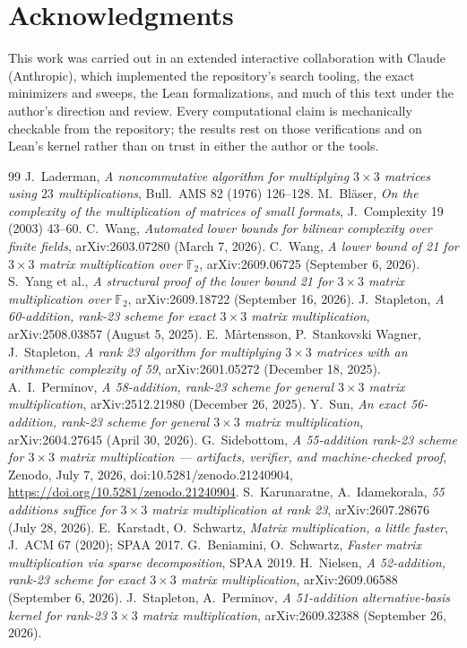 \documentclass[11pt]{article}
\theoremstyle{definition}
\theoremstyle{remark}
\newcommand{\F}{\mathbb{F}}
\begin{document}
\section*{Acknowledgments}

This work was carried out in an extended interactive collaboration
with Claude (Anthropic), which implemented the repository's search
tooling, the exact minimizers and sweeps, the Lean formalizations, and
much of this text under the author's direction and review.  Every
computational claim is mechanically checkable from the repository; the
results rest on those verifications and on Lean's kernel rather than
on trust in either the author or the tools.

\begin{thebibliography}{99}
 J.~Laderman, \emph{A noncommutative algorithm for
multiplying $3\times3$ matrices using $23$ multiplications}, Bull.\
AMS 82 (1976) 126--128.
 M.~Bl\"aser, \emph{On the complexity of the
multiplication of matrices of small formats}, J.\ Complexity 19
(2003) 43--60.
 C.~Wang, \emph{Automated lower bounds for bilinear
complexity over finite fields}, arXiv:2603.07280 (March 7, 2026).
\bibitem{Wang26b} C.~Wang, \emph{A lower bound of 21 for $3\times3$
matrix multiplication over $\F_2$}, arXiv:2609.06725 (September 6, 2026).
\bibitem{Qiushi26} S.~Yang et al., \emph{A structural proof of the
lower bound 21 for $3\times3$ matrix multiplication over $\F_2$},
arXiv:2609.18722 (September 16, 2026).
 J.~Stapleton, \emph{A 60-addition, rank-23
scheme for exact $3\times3$ matrix multiplication}, arXiv:2508.03857
(August 5, 2025).
 E.~M{\aa}rtensson, P.~Stankovski Wagner, J.~Stapleton,
\emph{A rank 23 algorithm for multiplying $3\times3$ matrices with an
arithmetic complexity of 59}, arXiv:2601.05272 (December 18, 2025).
\bibitem{Perminov25} A.~I.~Perminov, \emph{A 58-addition, rank-23
scheme for general $3\times3$ matrix multiplication}, arXiv:2512.21980
(December 26, 2025).
 Y.~Sun, \emph{An exact 56-addition, rank-23 scheme for
general $3\times3$ matrix multiplication}, arXiv:2604.27645
(April 30, 2026).
 G.~Sidebottom, \emph{A 55-addition rank-23
scheme for $3\times3$ matrix multiplication --- artifacts, verifier,
and machine-checked proof}, Zenodo, July 7, 2026,
doi:10.5281/zenodo.21240904,
\url{https://doi.org/10.5281/zenodo.21240904}.
 S.~Karunaratne, A.~Idamekorala, \emph{55 additions
suffice for $3\times3$ matrix multiplication at rank 23},
arXiv:2607.28676 (July 28, 2026).
 E.~Karstadt, O.~Schwartz, \emph{Matrix multiplication,
a little faster}, J.\ ACM 67 (2020); SPAA 2017.
 G.~Beniamini, O.~Schwartz, \emph{Faster matrix
multiplication via sparse decomposition}, SPAA 2019.
 H.~Nielsen, \emph{A 52-addition, rank-23 scheme
for exact $3\times3$ matrix multiplication}, arXiv:2609.06588
(September 6, 2026).
 J.~Stapleton, A.~Perminov, \emph{A 51-addition
alternative-basis kernel for rank-23 $3\times3$ matrix multiplication},
arXiv:2609.32388 (September 26, 2026).
\end{thebibliography}
\end{document}
